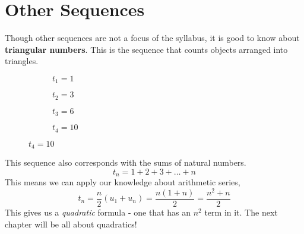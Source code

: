 \documentclass[../../main.tex]{subfiles}
\begin{document}
\section{Other Sequences}

Though other sequences are not a focus of the syllabus, it is good to know about \textbf{triangular numbers}. This is the sequence that counts objects arranged into triangles.
\begin{figure}[h]
    \centering
    \begin{subfigure}[h]{0.24\textwidth}
        \centering
        \caption*{\(t_1 = 1\)}
    \end{subfigure}
    \begin{subfigure}[h]{0.24\textwidth}
        \centering
        \caption*{\(t_2 = 3\)}
    \end{subfigure}
    \begin{subfigure}[h]{0.24\textwidth}
        \centering
        \caption*{\(t_3 = 6\)}
    \end{subfigure}
    \begin{subfigure}[h]{0.24\textwidth}
        \centering
        \caption*{\(t_4 = 10\)}
    \end{subfigure}
\end{figure}

This sequence also corresponds with the sums of natural numbers.
\[
    t_n = 1 + 2 + 3 + \ldots + n
\]
This means we can apply our knowledge about arithmetic series,
\[
    t_n = \frac{n}2(u_1 + u_n) = \frac{n(1 + n)}2 = \frac{n^2 + n}2
\]
This gives us a \emph{quadratic} formula - one that has an \(n^2\) term in it. The next chapter will be all about quadratics!
\end{document}

